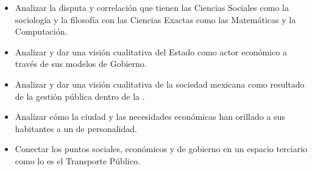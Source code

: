 \begin{itemize}
    \item Analizar la disputa y correlación que tienen las Ciencias Sociales como la sociología y la filosofía con las Ciencias Exactas como las Matemáticas y la Computación.
    \item Analizar y dar una visión cualitativa del Estado como actor económico a través de sus modelos de Gobierno.
    \item Analizar y dar una visión cualitativa de la sociedad mexicana como resultado de la gestión pública dentro de la \zmvm.
    \item Analizar cómo la ciudad y las necesidades económicas han orillado a sus habitantes a un  de personalidad.
    \item Conectar los puntos sociales, económicos y de gobierno en un espacio terciario como lo es el Transporte Público.
\end{itemize}
